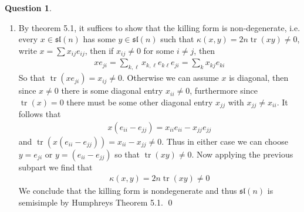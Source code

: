 \documentclass[10.5pt]{article}
\theoremstyle{definition}
\newtheorem{pb}{Question}
\numberwithin{example}{subsection}
\numberwithin{proposition}{subsection}
\begin{document}
\begin{pb}
\begin{enumerate}
            \item By theorem 5.1, it suffices to show that the killing form is non-degenerate, i.e. every \(x \in \mathfrak{sl}(n)\) has some \(y \in \mathfrak{sl}(n)\) such that \(\kappa(x,y) = 2n \operatorname{tr}(xy) \neq 0\), write \(x = \sum x_{ij}e_{ij}\), then if \(x_{ij} \neq 0\) for some \(i \neq j\), then
            \begin{align}
                xe_{ji} = \sum_{k,\ell} x_{k,\ell}e_{k\ell}e_{ji} = \sum_k x_{kj}e_{ki}
            \end{align}
            So that \(\operatorname{tr}(xe_{ji}) = x_{ij} \neq 0\). Otherwise we can assume \(x\) is diagonal, then since \(x \neq 0\) there is some diagonal entry \(x_{ii} \neq 0\), furthermore since \(\operatorname{tr}(x)=0\) there must be some other diagonal entry \(x_{jj}\) with \(x_{jj} \neq x_{ii}\). It follows that
            \begin{align}
                x(e_{ii} - e_{jj}) = x_{ii}e_{ii} - x_{jj}e_{jj}
            \end{align}
            and \(\operatorname{tr}(x(e_{ii} - e_{jj})) = x_{ii} - x_{jj} \neq 0\). Thus in either case we can choose \(y = e_{ji}\) or \(y = (e_{ii} - e_{jj})\) so that \(\operatorname{tr}(xy) \neq 0\). Now applying the previous subpart we find that
            \begin{align}
                \kappa(x,y) = 2n \operatorname{tr}(xy) \neq 0
            \end{align}
            We conclude that the killing form is nondegenerate and thus \(\mathfrak{sl}(n)\) is semisimple by Humphreys Theorem 5.1. \qed


\end{enumerate}
\end{pb}
\end{document}
